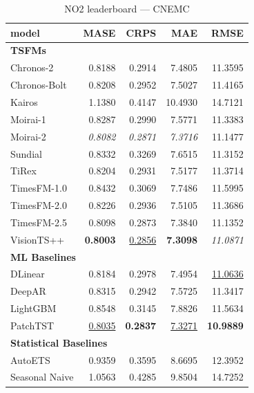 \begin{table}[H]
\caption{NO2 leaderboard --- CNEMC}
\centering
\begin{small}
\begin{tabular}{lrrrr}
\toprule
model & MASE & CRPS & MAE & RMSE \\
\midrule
\multicolumn{5}{l}{\textbf{TSFMs}} \\
Chronos-2 & 0.8188 & 0.2914 & 7.4805 & 11.3595 \\
Chronos-Bolt & 0.8208 & 0.2952 & 7.5027 & 11.4165 \\
Kairos & 1.1380 & 0.4147 & 10.4930 & 14.7121 \\
Moirai-1 & 0.8287 & 0.2990 & 7.5771 & 11.3383 \\
Moirai-2 & \textit{0.8082} & \textit{0.2871} & \textit{7.3716} & 11.1477 \\
Sundial & 0.8332 & 0.3269 & 7.6515 & 11.3152 \\
TiRex & 0.8204 & 0.2931 & 7.5177 & 11.3714 \\
TimesFM-1.0 & 0.8432 & 0.3069 & 7.7486 & 11.5995 \\
TimesFM-2.0 & 0.8226 & 0.2936 & 7.5105 & 11.3686 \\
TimesFM-2.5 & 0.8098 & 0.2873 & 7.3840 & 11.1352 \\
VisionTS++ & \textbf{0.8003} & \underline{0.2856} & \textbf{7.3098} & \textit{11.0871} \\
\midrule
\multicolumn{5}{l}{\textbf{ML Baselines}} \\
DLinear & 0.8184 & 0.2978 & 7.4954 & \underline{11.0636} \\
DeepAR & 0.8315 & 0.2942 & 7.5725 & 11.3417 \\
LightGBM & 0.8548 & 0.3145 & 7.8826 & 11.5634 \\
PatchTST & \underline{0.8035} & \textbf{0.2837} & \underline{7.3271} & \textbf{10.9889} \\
\midrule
\multicolumn{5}{l}{\textbf{Statistical Baselines}} \\
AutoETS & 0.9359 & 0.3595 & 8.6695 & 12.3952 \\
Seasonal Naive & 1.0563 & 0.4285 & 9.8504 & 14.7252 \\
\bottomrule
\end{tabular}
\end{small}
\end{table}